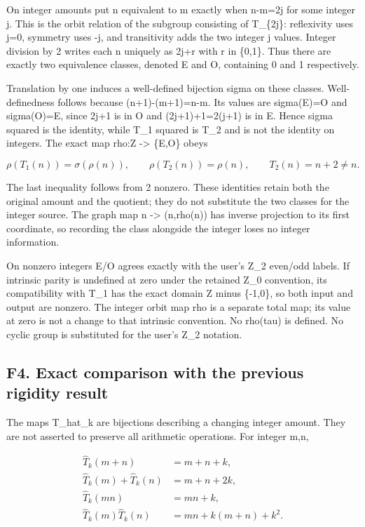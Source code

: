 \documentclass[
]{article}
\begin{document}
On integer amounts put n equivalent to m exactly when n-m=2j for some
integer j. This is the orbit relation of the subgroup consisting of
T\_\{2j\}: reflexivity uses j=0, symmetry uses -j, and transitivity adds
the two integer j values. Integer division by 2 writes each n uniquely
as 2j+r with r in \{0,1\}. Thus there are exactly two equivalence
classes, denoted E and O, containing 0 and 1 respectively.

Translation by one induces a well-defined bijection sigma on these
classes. Well-definedness follows because (n+1)-(m+1)=n-m. Its values
are sigma(E)=O and sigma(O)=E, since 2j+1 is in O and (2j+1)+1=2(j+1) is
in E. Hence sigma squared is the identity, while T\_1 squared is T\_2
and is not the identity on integers. The exact map rho:Z -\textgreater{}
\{E,O\} obeys

\[
\rho(T_1(n))=\sigma(\rho(n)),\qquad
\rho(T_2(n))=\rho(n),\qquad T_2(n)=n+2\ne n.
\tag{F3.1}
\]

The last inequality follows from 2 nonzero. These identities retain both
the original amount and the quotient; they do not substitute the two
classes for the integer source. The graph map n -\textgreater{}
(n,rho(n)) has inverse projection to its first coordinate, so recording
the class alongside the integer loses no integer information.

On nonzero integers E/O agrees exactly with the user's Z\_2 even/odd
labels. If intrinsic parity is undefined at zero under the retained Z\_0
convention, its compatibility with T\_1 has the exact domain Z minus
\{-1,0\}, so both input and output are nonzero. The integer orbit map
rho is a separate total map; its value at zero is not a change to that
intrinsic convention. No rho(tau) is defined. No cyclic group is
substituted for the user's Z\_2 notation.

\subsection{F4. Exact comparison with the previous rigidity
result}\label{f4.-exact-comparison-with-the-previous-rigidity-result}

The maps T\_hat\_k are bijections describing a changing integer amount.
They are not asserted to preserve all arithmetic operations. For integer
m,n,

\[
\begin{aligned}
\widehat T_k(m+n)&=m+n+k,\\
\widehat T_k(m)+\widehat T_k(n)&=m+n+2k,\\
\widehat T_k(mn)&=mn+k,\\
\widehat T_k(m)\widehat T_k(n)&=mn+k(m+n)+k^2.
\end{aligned}
\tag{F4.1}
\]
\end{document}

